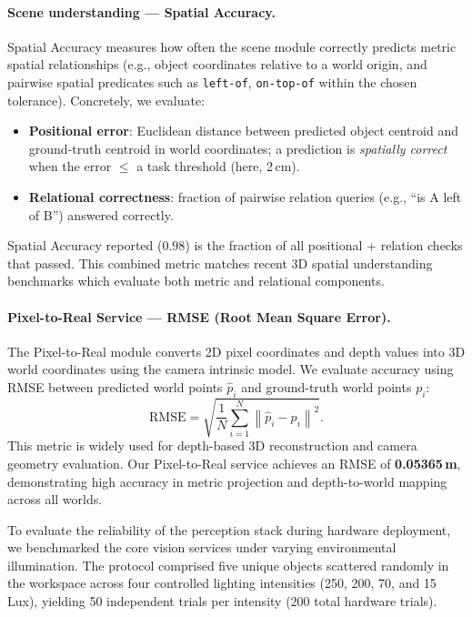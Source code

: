 \documentclass[12pt]{extarticle}
\begin{document}
\paragraph{Scene understanding — Spatial Accuracy.}
Spatial Accuracy measures how often the scene module correctly predicts metric spatial relationships (e.g., object coordinates relative to a world origin, and pairwise spatial predicates such as \texttt{left-of}, \texttt{on-top-of} within the chosen tolerance). Concretely, we evaluate:
\begin{itemize}
  \item \textbf{Positional error}: Euclidean distance between predicted object centroid and ground-truth centroid in world coordinates; a prediction is \emph{spatially correct} when the error $\leq$ a task threshold (here, 2\,cm).
  \item \textbf{Relational correctness}: fraction of pairwise relation queries (e.g., ``is A left of B'') answered correctly.
\end{itemize}
Spatial Accuracy reported ($0.98$) is the fraction of all positional + relation checks that passed. This combined metric matches recent 3D spatial understanding benchmarks which evaluate both metric and relational components. \cite{daxberger2025mmspatial,zhao2023vsd}


\paragraph{Pixel-to-Real Service — RMSE (Root Mean Square Error).}
The Pixel-to-Real module converts 2D pixel coordinates and depth values into 3D world coordinates using the camera intrinsic model. We evaluate accuracy using RMSE between predicted world points $\hat{p}_i$ and ground-truth world points $p_i$:
\[
\mathrm{RMSE} = 
\sqrt{
\frac{1}{N} \sum_{i=1}^{N} 
\left\| \hat{p}_i - p_i \right\|^{2}
}.
\]
This metric is widely used for depth-based 3D reconstruction and camera geometry evaluation. \cite{yin2021learning,teed2020raft3d}  
Our Pixel-to-Real service achieves an RMSE of \textbf{0.05365\,m}, demonstrating high accuracy in metric projection and depth-to-world mapping across all worlds.


To evaluate the reliability of the perception stack during hardware deployment, we benchmarked the core vision services under varying environmental illumination. The protocol comprised five unique objects scattered randomly in the workspace across four controlled lighting intensities (250, 200, 70, and 15 Lux), yielding 50 independent trials per intensity (200 total hardware trials). 
\end{document}
